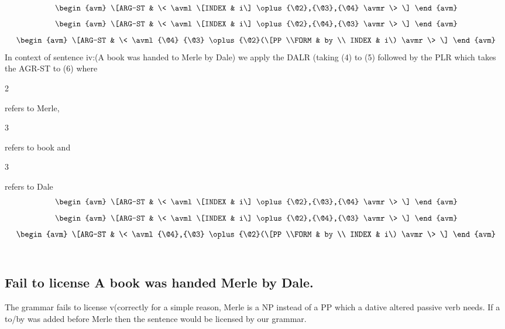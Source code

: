 \documentclass{article}
\begin{document}
\begin{equation}
\begin{avm}
\[ARG-ST & \< \avml \[INDEX & i\] \oplus {\@2},{\@3},{\@4} \avmr \> \]
\end{avm}
\end{equation}
\begin{equation}
\begin{avm}
\[ARG-ST & \< \avml \[INDEX & i\] \oplus {\@2},{\@4},{\@3} \avmr \> \]
\end{avm}
\end{equation}
\begin{equation}
\begin{avm}
\[ARG-ST & \< \avml {\@4} {\@3} \oplus {\@2}(\[PP \\FORM & by \\ INDEX & i\) \avmr \> \]
\end{avm}
\end{equation}
In context of sentence iv:(A book was handed to Merle by Dale) we apply the DALR (taking (4) to (5) followed by the PLR which takes the AGR-ST to (6) where \begin{avm}{\@2}\end{avm} refers to Merle, \begin{avm}{\@3}\end{avm} refers to book and \begin{avm}{\@3}\end{avm} refers to Dale \\
\begin{equation}
\begin{avm}
\[ARG-ST & \< \avml \[INDEX & i\] \oplus {\@2},{\@3},{\@4} \avmr \> \]
\end{avm}
\end{equation}
\begin{equation}
\begin{avm}
\[ARG-ST & \< \avml \[INDEX & i\] \oplus {\@2},{\@4},{\@3} \avmr \> \]
\end{avm}
\end{equation}
\begin{equation}
\begin{avm}
\[ARG-ST & \< \avml  {\@4},{\@3} \oplus {\@2}(\[PP \\FORM & by \\ INDEX & i\) \avmr \> \]
\end{avm}
\end{equation} \\
\subsection{Fail to license A book was handed Merle by Dale.}
The grammar fails to license v(correctly for a simple reason, Merle is a NP instead of a PP which a dative altered passive verb needs. If a to/by was added before Merle then the sentence would be licensed by our grammar.
\end{document}
